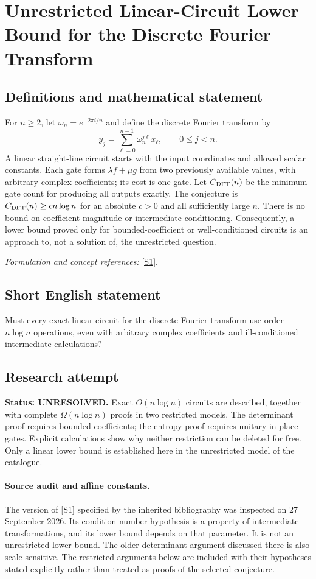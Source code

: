 \documentclass[11pt]{article}
\begin{document}
\section*{\texorpdfstring{Unrestricted Linear-Circuit Lower Bound for the Discrete Fourier Transform}{Unrestricted Linear-Circuit Lower Bound for the Discrete Fourier Transform}}\label{statement}
\subsection{Definitions and mathematical statement}
For $n\ge2$, let $\omega_n=e^{-2\pi i/n}$ and define the discrete Fourier transform by
\[
 y_j=\sum_{\ell=0}^{n-1}\omega_n^{j\ell}x_\ell,
 \qquad0\le j<n.
\]
A linear straight-line circuit starts with the input coordinates and allowed scalar constants. Each gate forms $\lambda f+\mu g$ from two previously available values, with arbitrary complex coefficients; its cost is one gate. Let $C_{\rm DFT}(n)$ be the minimum gate count for producing all outputs exactly. The conjecture is $C_{\rm DFT}(n)\ge c n\log n$ for an absolute $c>0$ and all sufficiently large $n$. There is no bound on coefficient magnitude or intermediate conditioning. Consequently, a lower bound proved only for bounded-coefficient or well-conditioned circuits is an approach to, not a solution of, the unrestricted question.
\par\smallskip\textit{Formulation and concept references:} \href{https://arxiv.org/pdf/1403.1307v5}{[S1]}.

\subsection{Short English statement}
Must every exact linear circuit for the discrete Fourier transform use order $n\log n$ operations, even with arbitrary complex coefficients and ill-conditioned intermediate calculations?
\subsection{Research attempt}
\textbf{Status: UNRESOLVED.} Exact $O(n\log n)$ circuits are described, together with complete $\Omega(n\log n)$ proofs in two restricted models. The determinant proof requires bounded coefficients; the entropy proof requires unitary in-place gates. Explicit calculations show why neither restriction can be deleted for free. Only a linear lower bound is established here in the unrestricted model of the catalogue.

\paragraph{Source audit and affine constants.}
The version of [S1] specified by the inherited bibliography was inspected on 27 September 2026. Its condition-number hypothesis is a property of intermediate transformations, and its lower bound depends on that parameter. It is not an unrestricted lower bound. The older determinant argument discussed there is also scale sensitive. The restricted arguments below are included with their hypotheses stated explicitly rather than treated as proofs of the selected conjecture.
\end{document}
